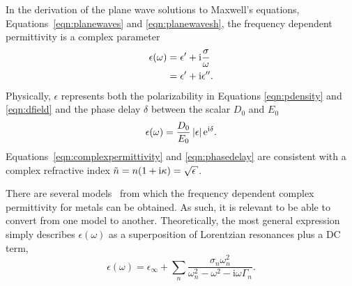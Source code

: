 In the derivation of the plane wave solutions to Maxwell's equations,
Equations~\ref{eqn:planewaves} and \ref{eqn:planewavesh}, the
frequency dependent permittivity is a complex parameter
\begin{align}
 \epsilon(\omega) &= \epsilon^\prime + {\mathrm{i}} \frac{\sigma}{\omega}\\
                   &= \epsilon^\prime + {\mathrm{i}}\epsilon^{\prime\prime}.
																			\label{eqn:complexpermittivity}
\end{align}
Physically, $\epsilon$ represents
both the polarizability in Equations \ref{eqn:pdensity} and
\ref{eqn:dfield} and the phase delay $\delta$ between the scalar $D_0$ and
$E_0$
\begin{equation}
 \epsilon(\omega) = \frac{D_0}{E_0} \,|\epsilon| \,{\mathrm{e}}^{{\mathrm{i}} \delta}.
	\label{eqn:phasedelay}
\end{equation}
Equations~\ref{eqn:complexpermittivity} and \ref{eqn:phasedelay} are
consistent with a complex refractive index $\tilde{n} = n(1+\mi \kappa) =
\sqrt{\epsilon}$.

There are several models~\cite{rakic1998optical} from which
the frequency dependent complex permittivity for metals can be obtained.
As such, it is relevant to be able to convert from one model to another.
Theoretically, the most general expression simply describes
$\epsilon(\omega)$ as a superposition of Lorentzian resonances plus a DC
term,
\begin{equation}
\epsilon(\omega)= \epsilon_\infty+\sum_n \frac{\sigma_n \omega_n^2} {\omega_n^2-\omega^2-{\mathrm{i}}\omega\Gamma_n}.
\label{eqn:meepdispersion}
\end{equation}

